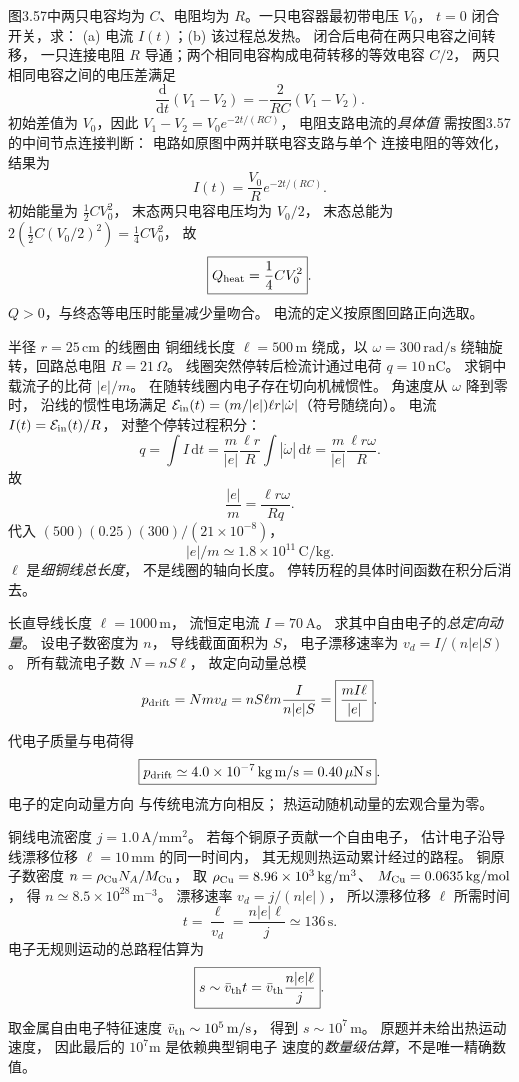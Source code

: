 图3.57中两只电容均为 $C$、电阻均为
$R$。一只电容器最初带电压 $V_0$，
$t=0$ 闭合开关，求：
(a) 电流 $I(t)$；(b) 该过程总发热。
\exsolution
闭合后电荷在两只电容之间转移，
一只连接电阻 $R$ 导通；两个相同电容构成电荷转移的等效电容 $C/2$，
两只相同电容之间的电压差满足
\[
\frac{\mathrm d}{\mathrm dt}(V_1-V_2)
=-\frac{2}{RC}(V_1-V_2).
\]
初始差值为 $V_0$，因此
$V_1-V_2=V_0e^{-2t/(RC)}$，
电阻支路电流的\emph{具体值}
需按图3.57的中间节点连接判断：
电路如原图中两并联电容支路与单个
连接电阻的等效化，结果为
\[
\boxed{I(t)=\frac{V_0}{R}e^{-2t/(RC)}}.
\]
初始能量为 $\frac12CV_0^2$，
末态两只电容电压均为 $V_0/2$，
末态总能为
$2(\frac12C(V_0/2)^2)=\frac14CV_0^2$，
故
\[
\boxed{Q_{\rm heat}=\frac14CV_0^2}.
\]
\excheck $Q>0$，与终态等电压时能量减少量吻合。
电流的定义按原图回路正向选取。

半径 $r=25\,\mathrm{cm}$ 的线圈由
铜细线长度 $\ell=500\,\mathrm m$
绕成，以 $\omega=300\,\mathrm{rad/s}$
绕轴旋转，回路总电阻
$R=21\,\Omega$。
线圈突然停转后检流计通过电荷
$q=10\,\mathrm{nC}$。
求铜中载流子的比荷 $|e|/m$。
\exsolution
在随转线圈内电子存在切向机械惯性。
角速度从 $\omega$ 降到零时，
沿线的惯性电场满足
$\mathcal E_{\rm in}(t)=(m/|e|)\ell r
|\dot\omega|$（符号随绕向）。
电流 $I(t)=\mathcal E_{\rm in}(t)/R$，
对整个停转过程积分：
\[
q=\int I\,\mathrm dt
=\frac{m}{|e|}\frac{\ell r}{R}
\int|\dot\omega|\,\mathrm dt
=\frac{m}{|e|}\frac{\ell r\omega}{R}.
\]
故
\[
\boxed{\frac{|e|}{m}=
\frac{\ell r\omega}{Rq}}.
\]
代入
$(500)(0.25)(300)/(21\times10^{-8})$，
\[
\boxed{|e|/m\simeq1.8\times10^{11}\,\mathrm{C/kg}}.
\]
\excheck $\ell$ 是\emph{细铜线总长度}，
不是线圈的轴向长度。
停转历程的具体时间函数在积分后消去。

长直导线长度 $\ell=1000\,\mathrm m$，
流恒定电流 $I=70\,\mathrm A$。
求其中自由电子的\emph{总定向动量}。
\exsolution
设电子数密度为 $n$，
导线截面面积为 $S$，
电子漂移速率为
$v_d=I/(n|e|S)$。
所有载流电子数
$N=nS\ell$，
故定向动量总模
\[
p_{\rm drift}=Nmv_d
=nS\ell m\frac{I}{n|e|S}
=\boxed{\frac{mI\ell}{|e|}}.
\]
代电子质量与电荷得
\[
\boxed{p_{\rm drift}\simeq4.0\times10^{-7}\,
\mathrm{kg\,m/s}=0.40\,\mathrm{\mu N\,s}}.
\]
\excheck 电子的定向动量方向
与传统电流方向相反；
热运动随机动量的宏观合量为零。

铜线电流密度
$j=1.0\,\mathrm{A/mm^2}$。
若每个铜原子贡献一个自由电子，
估计电子沿导线漂移位移
$\ell=10\,\mathrm{mm}$ 的同一时间内，
其无规则热运动累计经过的路程。
\exsolution
铜原子数密度
$n=\rho_{\rm Cu}N_A/M_{\rm Cu}$，
取 $\rho_{\rm Cu}=8.96\times10^3
\,\mathrm{kg/m^3}$、
$M_{\rm Cu}=0.0635\,\mathrm{kg/mol}$，
得 $n\simeq8.5\times10^{28}\,\mathrm{m^{-3}}$。
漂移速率
$v_d=j/(n|e|)$，
所以漂移位移 $\ell$ 所需时间
\[
t=\frac{\ell}{v_d}=\frac{n|e|\ell}{j}
\simeq136\,\mathrm s.
\]
电子无规则运动的总路程估算为
\[
\boxed{s\sim\bar v_{\rm th}t
=\bar v_{\rm th}\frac{n|e|\ell}{j}}.
\]
取金属自由电子特征速度
$\bar v_{\rm th}\sim10^5\,\mathrm{m/s}$，
得到
$\boxed{s\sim10^7\,\mathrm m}$。
\excheck 原题并未给出热运动速度，
因此最后的 $10^7$m 是依赖典型铜电子
速度的\emph{数量级估算}，不是唯一精确数值。

